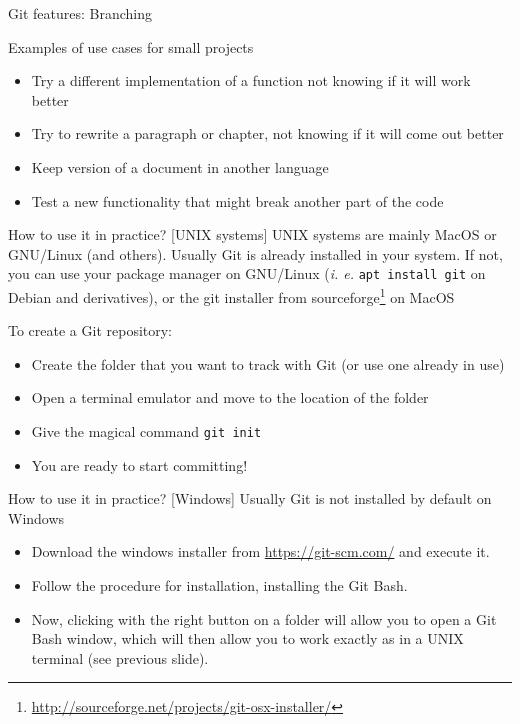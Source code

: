 \documentclass[aspectratio=169]{beamer}
\newcommand{\git}{Git{}}
\newcommand{\cd}[1]{\texttt{#1}}
\begin{document}
\begin{frame}{\git{} features: Branching}
    \begin{block}{Examples of use cases for small projects}
        \begin{itemize}
        \justifying
            \item Try a different implementation of a function not knowing if it will work better
            \item Try to rewrite a paragraph or chapter, not knowing if it will come out better
            \item Keep version of a document in another language
            \item Test a new functionality that might break another part of the code
        \end{itemize}
    \end{block}
\end{frame}

\begin{frame}{How to use it in practice? [UNIX systems]}
    UNIX systems are mainly MacOS or GNU/Linux (and others). Usually \git{} is \alert{already installed} in your system. If not, you can use your package manager on GNU/Linux (\emph{i. e.} \cd{apt install git} on Debian and derivatives), or the git installer from sourceforge\footnote{\url{http://sourceforge.net/projects/git-osx-installer/}} on MacOS
    \begin{block}{To create a \git{} repository:}
        \begin{itemize}
        \justifying
            \item Create the folder that you want to track with \git{} (or use one already in use)
            \item Open a terminal emulator and move to the location of the folder
            \item Give the magical command \cd{git init}
            \item You are ready to start committing!
        \end{itemize}
    \end{block}
\end{frame}

\begin{frame}{How to use it in practice? [Windows]}
    Usually \git{} is \alert{not installed} by default on Windows
    \begin{itemize}
    \justifying
        \item Download the windows installer from \url{https://git-scm.com/} and execute it.
        \item Follow the procedure for installation, installing the Git Bash.
        \item Now, clicking with the right button on a folder will allow you to open a Git Bash window, which will then allow you to work exactly as in a UNIX terminal (see previous slide).
    \end{itemize}
\end{frame}
\end{document}

